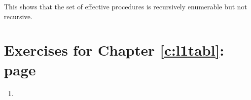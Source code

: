 {\begin{enumerate}
\begin{enumerate}
\begin{enumerate}
This shows that the set of effective procedures is recursively enumerable but not recursive.

	\end{enumerate}
\end{enumerate}
\end{enumerate}

}

\section*{Exercises for Chapter \ref{c:l1tabl}: page \pageref{ex:l1tabl}} \label{ans:l1tabl}

{\small
\begin{enumerate}
\item ~{\qobitree
}



\end{enumerate}}
